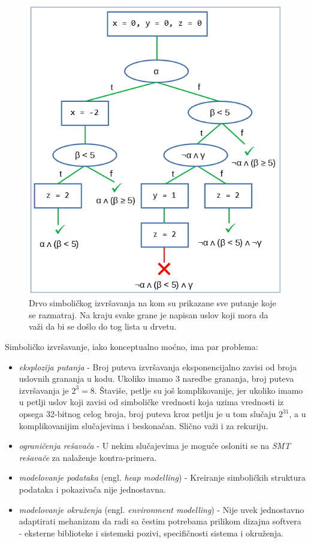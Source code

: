 \begin{figure}[h!]
    \centering
    \includegraphics[scale=0.8]{images/sym_tree.png}
    \caption{Drvo simboličkog izvršavanja na kom su prikazane sve putanje koje se razmatraj. Na kraju svake grane je napisan uslov koji mora da važi da bi se došlo do tog lista u drvetu.}
    \label{fig:SymbolicExecTree}
\end{figure}

Simboličko izvršavanje, iako konceptualno moćno, ima par problema:
\begin{itemize}
    \item \emph{eksplozija putanja} - Broj puteva izvršavanja eksponencijalno zavisi od broja uslovnih grananja u kodu. Ukoliko imamo 3 naredbe grananja, broj puteva izvršavanja je $2^3=8$. Štaviše, petlje su još komplikovanije, jer ukoliko imamo u petlji uslov koji zavisi od simboličke vrednosti koja uzima vrednosti iz opsega 32-bitnog celog broja, broj puteva kroz petlju je u tom slučaju $2^31$, a u komplikovanijim slučajevima i beskonačan. Slično važi i za rekuriju.
    \item \emph{ograničenja rešavača} - U nekim slučajevima je moguće osloniti se na \emph{SMT rešavače} \cite{SMT} za nalaženje kontra-primera.
    \item \emph{modelovanje podataka} (engl. \emph{heap modelling}) - Kreiranje simboličkih struktura podataka i pokazivača nije jednostavna.
    \item \emph{modelovanje okruženja} (engl. \emph{environment modelling}) - Nije uvek jednostavno adaptirati mehanizam da radi sa čestim potrebama prilikom dizajna softvera - eksterne biblioteke i sistemski pozivi, specifičnosti sistema i okruženja.
\end{itemize}

